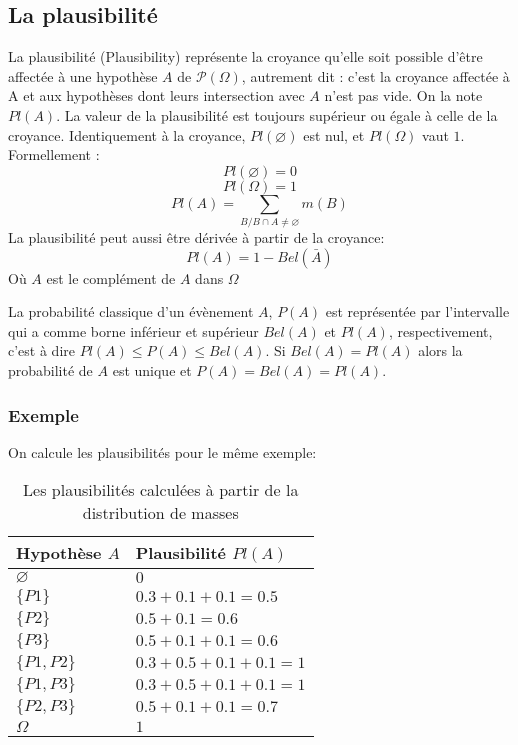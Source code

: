 \subsection{La plausibilité}

La plausibilité (Plausibility) représente la croyance qu’elle soit possible
d’être affectée à une hypothèse $A$ de $\mathcal{P}(\Omega)$, autrement dit
: c’est la croyance affectée à A et aux hypothèses dont leurs intersection
avec $A$ n’est pas vide. On la note $Pl(A)$. La valeur de la plausibilité est
toujours supérieur ou égale à celle de la croyance. Identiquement à la
croyance, $Pl(\varnothing)$ est nul, et $Pl(\Omega)$ vaut $1$.\\
Formellement :
\begin{equation}
Pl(\varnothing) = 0
\end{equation}
\begin{equation}
Pl(\Omega) = 1
\end{equation}
\begin{equation}
Pl(A) = \sum_{B \slash B \cap A \neq \varnothing} m(B)
\end{equation}
La plausibilité peut aussi être dérivée à partir de la croyance:
\begin{equation}
Pl(A) = 1 - Bel(\bar{A})
\end{equation}
Où $A$ est le complément de $A$ dans $\Omega$

La probabilité classique d’un évènement $A$, $P(A)$ est représentée par
l’intervalle qui a comme borne inférieur et supérieur $Bel(A)$ et $Pl(A)$,
respectivement, c’est à dire $Pl(A) \leq P(A) \leq Bel(A)$. Si $Bel(A) = Pl(A)$
alors la probabilité de $A$ est unique et $P(A) = Bel(A) = Pl(A)$.

\subsubsection{Exemple}
On calcule les plausibilités pour le même exemple:

\begin{table}[ht]
\begin{center}
\begin{tabular}{|l|l|}
\hline
Hypothèse $A$ & Plausibilité $Pl(A)$\\
\hline
$\varnothing$ & $0$ \\
\hline
$\{P1\}$ & $0.3 + 0.1 + 0.1 = 0.5$ \\
\hline
$\{P2\}$ & $0.5 + 0.1 = 0.6$ \\
\hline
$\{P3\}$ & $0.5 + 0.1 + 0.1 = 0.6$ \\
\hline
$\{P1, P2\}$ & $0.3 + 0.5 + 0.1 + 0.1 = 1$ \\
\hline
$\{P1, P3\}$ & $0.3 + 0.5 + 0.1 + 0.1 = 1$ \\
\hline
$\{P2, P3\}$ & $0.5 + 0.1 + 0.1 = 0.7$ \\
\hline
$\Omega$ & $1$ \\
\hline
\end{tabular}
\caption{Les plausibilités calculées à partir de la distribution de masses}
\end{center}
\end{table}
